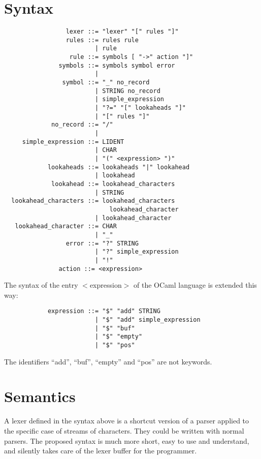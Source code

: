 \documentclass[11pt]{article}
\begin{document}
\section{Syntax}

\begin{verbatim}
                 lexer ::= "lexer" "[" rules "]"
                 rules ::= rules rule
                         | rule
                  rule ::= symbols [ "->" action "]"
               symbols ::= symbols symbol error
                         |
                symbol ::= "_" no_record
                         | STRING no_record
                         | simple_expression
                         | "?=" "[" lookaheads "]"
                         | "[" rules "]"
             no_record ::= "/"
                         |
     simple_expression ::= LIDENT
                         | CHAR
                         | "(" <expression> ")"
            lookaheads ::= lookaheads "|" lookahead
                         | lookahead
             lookahead ::= lookahead_characters
                         | STRING
  lookahead_characters ::= lookahead_characters
                             lookahead_character
                         | lookahead_character
   lookahead_character ::= CHAR
                         | "_"
                 error ::= "?" STRING
                         | "?" simple_expression
                         | "!"
               action ::= <expression>
\end{verbatim}

The syntax of the entry $<$expression$>$ of the OCaml language is
extended this way:

\begin{verbatim}
            expression ::= "$" "add" STRING
                         | "$" "add" simple_expression
                         | "$" "buf"
                         | "$" "empty"
                         | "$" "pos"
\end{verbatim}

The identifiers ``add'', ``buf'', ``empty'' and ``pos'' are not keywords.

\section{Semantics}

A lexer defined in the syntax above is a shortcut version of a parser
applied to the specific case of streams of characters. They could be
written with normal parsers. The proposed syntax is much more short,
easy to use and understand, and silently takes care of the lexer
buffer for the programmer.
\end{document}
